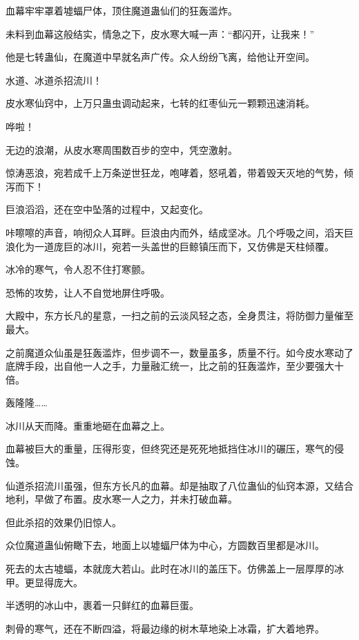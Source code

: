 
\begin{this_body}



血幕牢牢罩着墟蝠尸体，顶住魔道蛊仙们的狂轰滥炸。

未料到血幕这般结实，情急之下，皮水寒大喊一声：“都闪开，让我来！”

他是七转蛊仙，在魔道中早就名声广传。众人纷纷飞离，给他让开空间。

水道、冰道杀招流川！

皮水寒仙窍中，上万只蛊虫调动起来，七转的红枣仙元一颗颗迅速消耗。

哗啦！

无边的浪潮，从皮水寒周围数百步的空中，凭空激射。

惊涛恶浪，宛若成千上万条逆世狂龙，咆哮着，怒吼着，带着毁天灭地的气势，倾泻而下！

巨浪滔滔，还在空中坠落的过程中，又起变化。

咔嚓嚓的声音，响彻众人耳畔。巨浪由内而外，结成坚冰。几个呼吸之间，滔天巨浪化为一道庞巨的冰川，宛若一头盖世的巨鲸镇压而下，又仿佛是天柱倾覆。

冰冷的寒气，令人忍不住打寒颤。

恐怖的攻势，让人不自觉地屏住呼吸。

大殿中，东方长凡的星意，一扫之前的云淡风轻之态，全身贯注，将防御力量催至最大。

之前魔道众仙虽是狂轰滥炸，但步调不一，数量虽多，质量不行。如今皮水寒动了底牌手段，出自他一人之手，力量融汇统一，比之前的狂轰滥炸，至少要强大十倍。

轰隆隆……

冰川从天而降。重重地砸在血幕之上。

血幕被巨大的重量，压得形变，但终究还是死死地抵挡住冰川的碾压，寒气的侵蚀。

仙道杀招流川虽强，但东方长凡的血幕。却是抽取了八位蛊仙的仙窍本源，又结合地利，早做了布置。皮水寒一人之力，并未打破血幕。

但此杀招的效果仍旧惊人。

众位魔道蛊仙俯瞰下去，地面上以墟蝠尸体为中心，方圆数百里都是冰川。

死去的太古墟蝠，本就庞大若山。此时在冰川的盖压下。仿佛盖上一层厚厚的冰甲。更显得庞大。

半透明的冰山中，裹着一只鲜红的血幕巨蛋。

刺骨的寒气，还在不断四溢，将最边缘的树木草地染上冰霜，扩大着地界。


\end{this_body}
